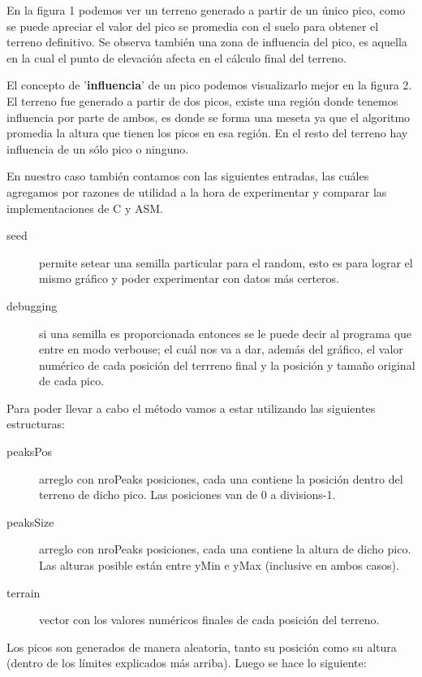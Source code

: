 En la figura 1 podemos ver un terreno generado a partir de un único pico, como se puede apreciar el valor del pico se promedia con el suelo para obtener el terreno definitivo. Se observa también una zona de influencia del pico, es aquella en la cual el punto de elevación afecta en el cálculo final del terreno.


El concepto de '\textbf{influencia}' de un pico podemos visualizarlo mejor en la figura 2. El terreno fue generado a partir de dos picos, existe una región  donde tenemos influencia por parte de ambos, es donde se forma una meseta ya que el algoritmo promedia la altura que tienen los picos en esa región. En el resto del terreno hay influencia de un sólo pico o ninguno.

En nuestro caso también contamos con las siguientes entradas, las cuáles agregamos por razones de utilidad a la hora de experimentar y comparar las implementaciones de C y ASM.
\begin{description}
\item[seed] permite setear una semilla particular para el random, esto es para lograr el mismo gráfico y poder experimentar con datos más certeros.
\item[debugging] si una semilla es proporcionada entonces se le puede decir al programa que entre en modo verbouse; el cuál nos va a dar, además del gráfico, el valor numérico de cada posición del terrreno final y la posición y tamaño original de cada pico.
\end{description}
\smallskip

Para poder llevar a cabo el método vamos a estar utilizando las siguientes estructuras:
\begin{description}
\item[peaksPos] arreglo con nroPeaks posiciones, cada una contiene la posición dentro del terreno de dicho pico. Las posiciones van de 0 a divisions-1.
\item[peaksSize] arreglo con nroPeaks posiciones, cada una contiene la altura de dicho pico. Las alturas posible están entre yMin e yMax (inclusive en ambos casos).
\item[terrain] vector con los valores numéricos finales de cada posición del terreno.
\end{description}
\smallskip

Los picos son generados de manera aleatoria, tanto su posición como su altura (dentro de los límites explicados más arriba). Luego se hace lo siguiente:

